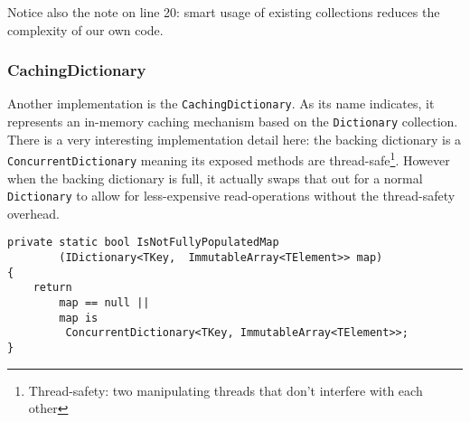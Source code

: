 Notice also the note on line 20: smart usage of existing collections reduces the complexity of our own code.

\subsubsection{CachingDictionary}
\label{sec:spec-coll-cachingdictionary}

Another implementation is the \verb|CachingDictionary|. As its name indicates, it represents an in-memory caching mechanism based on the \verb|Dictionary| collection. There is a very interesting implementation detail here: the backing dictionary is a \verb|ConcurrentDictionary| meaning its exposed methods are thread-safe\footnote{Thread-safety: two manipulating threads that don't interfere with each other}. However when the backing dictionary is full, it actually swaps that out for a normal \verb|Dictionary| to allow for less-expensive read-operations without the thread-safety overhead.

\begin{lstlisting}
private static bool IsNotFullyPopulatedMap
		(IDictionary<TKey,	ImmutableArray<TElement>> map)
{
	return 
		map == null || 
		map is 
		 ConcurrentDictionary<TKey, ImmutableArray<TElement>>;
}
\end{lstlisting}

